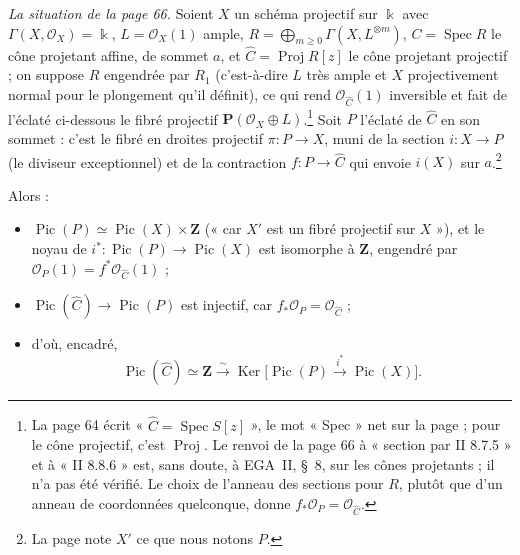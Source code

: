 \documentclass[11pt,a4paper]{article}
\begin{document}
\emph{La situation de la page 66.} Soient $X$ un schéma projectif sur
$\Bbbk$ avec $\Gamma(X, \mathcal{O}_X) = \Bbbk$, $L = \mathcal{O}_X(1)$ ample,
$R = \bigoplus_{m \geq 0} \Gamma(X, L^{\otimes m})$, $C = \operatorname{Spec}
R$ le cône projetant affine, de sommet $a$, et $\widehat{C} =
\operatorname{Proj} R[z]$ le cône projetant projectif ; on suppose $R$
engendrée par $R_1$ (c'est-à-dire $L$ très ample et $X$ projectivement normal
pour le plongement qu'il définit), ce qui rend $\mathcal{O}_{\widehat{C}}(1)$
inversible et fait de l'éclaté ci-dessous le fibré projectif
$\mathbf{P}(\mathcal{O}_X \oplus L)$.\footnote{La page 64
écrit « $\widehat{C} = \operatorname{Spec} S[z]$ », le mot « Spec » net sur la
page ; pour le cône projectif, c'est $\operatorname{Proj}$. Le
renvoi de la page 66 à « section par II 8.7.5 » et à « II 8.8.6 » est, sans doute, à EGA~II,
§~8, sur les cônes projetants ; il n'a pas été vérifié. Le choix de l'anneau des sections pour $R$,
plutôt que d'un anneau de coordonnées quelconque, donne
$f_* \mathcal{O}_P = \mathcal{O}_{\widehat{C}}$.} Soit $P$ l'éclaté de
$\widehat{C}$ en son sommet : c'est le fibré en droites projectif
$\pi\colon P \to X$, muni de la section $i\colon X \to P$ (le diviseur
exceptionnel) et de la contraction $f\colon P \to \widehat{C}$ qui envoie
$i(X)$ sur $a$.\footnote{La page note $X'$ ce que nous notons $P$.}


Alors :
\begin{itemize}
\item $\operatorname{Pic}(P) \simeq \operatorname{Pic}(X) \times \mathbf{Z}$
(« car $X'$ est un fibré projectif sur $X$ »), et le noyau de
$i^*\colon \operatorname{Pic}(P) \to \operatorname{Pic}(X)$ est isomorphe à
$\mathbf{Z}$, engendré par $\mathcal{O}_P(1) = f^* \mathcal{O}_{\widehat{C}}(1)$ ;
\item $\operatorname{Pic}(\widehat{C}) \to \operatorname{Pic}(P)$ est injectif,
car $f_* \mathcal{O}_P = \mathcal{O}_{\widehat{C}}$ ;
\item d'où, encadré,
\[
  \operatorname{Pic}(\widehat{C}) \simeq \mathbf{Z} \xrightarrow{\ \sim\ }
  \operatorname{Ker}\bigl[\operatorname{Pic}(P) \xrightarrow{i^*} \operatorname{Pic}(X)\bigr] .
\]
\end{itemize}
\end{document}
